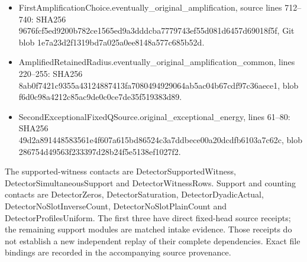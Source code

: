 \documentclass[11pt,a4paper]{article}
\newcommand{\sourcecode}[1]{{\small\ttfamily #1}}
\providecommand{\tightlist}{\setlength{\itemsep}{0pt}\setlength{\parskip}{0pt}}
\begin{document}
\begin{itemize}
\tightlist
\item
  \sourcecode{First\allowbreak{}Amplification\allowbreak{}Choice.\allowbreak{}eventually\_\allowbreak{}\allowbreak{}original\_\allowbreak{}\allowbreak{}amplification},
  source lines 712--740: SHA256
  \sourcecode{9676fcf5\allowbreak{}ed9200b7\allowbreak{}82ce1565\allowbreak{}ed9a3ddd\allowbreak{}cba77797\allowbreak{}43ef55d0\allowbreak{}81d6457d\allowbreak{}69018f5f}, Git
  blob \sourcecode{1e7a23d2\allowbreak{}f1319bd7\allowbreak{}a025a0ee\allowbreak{}8148a577\allowbreak{}c685b52d}.
\item
  \sourcecode{Amplified\allowbreak{}Retained\allowbreak{}Radius.\allowbreak{}eventually\_\allowbreak{}\allowbreak{}original\_\allowbreak{}\allowbreak{}amplification\_\allowbreak{}\allowbreak{}common},
  lines 220--255: SHA256
  \sourcecode{8ab0f742\allowbreak{}1c9355a4\allowbreak{}31248874\allowbreak{}13fa7080\allowbreak{}49492906\allowbreak{}4ab5ac04\allowbreak{}b67cdf97\allowbreak{}c36aece1}, blob
  \sourcecode{f6d0c98a\allowbreak{}4212c85a\allowbreak{}c9de0c0c\allowbreak{}e7de35f5\allowbreak{}19383d89}.
\item
  \sourcecode{Second\allowbreak{}Exceptional\allowbreak{}Fixed\allowbreak{}QSource.\allowbreak{}original\_\allowbreak{}\allowbreak{}exceptional\_\allowbreak{}\allowbreak{}energy},
  lines 61--80: SHA256
  \sourcecode{49d2a891\allowbreak{}44858356\allowbreak{}1e4f607a\allowbreak{}615bd865\allowbreak{}24c3a7dd\allowbreak{}bece00a2\allowbreak{}0dcdfb61\allowbreak{}03a7c62c}, blob
  \sourcecode{286754d4\allowbreak{}9563f233\allowbreak{}397d28b2\allowbreak{}4f5e5138\allowbreak{}ef1027f2}.
\end{itemize}

The supported-witness contacts are \sourcecode{Detector\allowbreak{}Supported\allowbreak{}Witness},
\sourcecode{Detector\allowbreak{}Simultaneous\allowbreak{}Support} and \sourcecode{Detector\allowbreak{}Witness\allowbreak{}Rows}.
Support and counting contacts are \sourcecode{Detector\allowbreak{}Zeros},
\sourcecode{Detector\allowbreak{}Saturation}, \sourcecode{Detector\allowbreak{}Dyadic\allowbreak{}Actual},
\sourcecode{Detector\allowbreak{}No\allowbreak{}Slot\allowbreak{}Inverse\allowbreak{}Count}, \sourcecode{Detector\allowbreak{}No\allowbreak{}Slot\allowbreak{}Plain\allowbreak{}Count}
and \sourcecode{Detector\allowbreak{}Profiles\allowbreak{}Uniform}. The first three have direct
fixed-head source receipts; the remaining support modules are matched
intake evidence. Those receipts do not establish a new independent
replay of their complete dependencies. Exact file bindings are recorded
in the accompanying source provenance.
\end{document}
